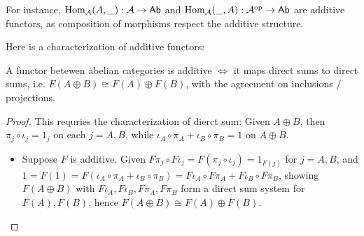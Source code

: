\documentclass{article}
\begin{document}
For instance, $\mathrm{Hom}_\mathcal{A}(A,\_):\mathcal{A}\rightarrow\mathsf{Ab}$ and $\mathrm{Hom}_\mathcal{A}(\_,A):\mathcal{A}^\text{op}\rightarrow\mathsf{Ab}$ are additive functors, as composition of morphisms respect the additive structure.

\hfil

Here is a characterization of additive functors:
\begin{thm}
    A functor betewen abelian categories is additive $\iff$ it maps direct sums to direct sums, i.e. $F(A\oplus B)\cong F(A)\oplus F(B)$, with the agreement on inclusions / projections.
\end{thm}
\begin{proof}
    This requries the characterization of dierct sum: Given $A\oplus B$, then $\pi_j\circ \iota_j = 1_j$ on each $j=A,B$, while $\iota_A\circ \pi_A + \iota_B\circ \pi_B = 1$ on $A\oplus B$.

    \hfil

    \begin{itemize}
        \item[$\implies$:] Suppose $F$ is additive. Given $F \pi_j\circ F\iota_j=F(\pi_j\circ \iota_j) = 1_{F(j)}$ for $j=A,B$, and $1 = F(1) = F(\iota_A\circ \pi_A+\iota_B\circ \pi_B) = F\iota_A\circ F\pi_A + F\iota_B\circ F\pi_B$, showing $F(A\oplus B)$ with $F\iota_A,F\iota_B,F\pi_A,F\pi_B$ form a direct sum system for $F(A),F(B)$, hence $F(A\oplus B)\cong F(A)\oplus F(B)$.
        
        \hfil


\end{itemize}
\end{proof}
\end{document}
